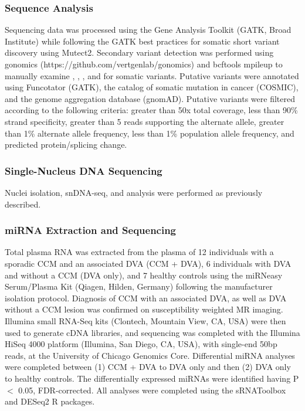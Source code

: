 \subsubsection{Sequence Analysis}
	Sequencing data was processed using the Gene Analysis Toolkit (GATK, Broad Institute) while following the GATK best practices for somatic short variant discovery using Mutect2. Secondary variant detection was performed using gonomics (https://github.com/vertgenlab/gonomics) and bcftools mpileup to manually examine , , , and  for somatic variants. Putative variants were annotated using Funcotator (GATK), the catalog of somatic mutation in cancer (COSMIC), and the genome aggregation database (gnomAD). Putative variants were filtered according to the following criteria: greater than 50x total coverage, less than 90\% strand specificity, greater than 5 reads supporting the alternate allele, greater than 1\% alternate allele frequency, less than 1\% population allele frequency, and predicted protein/splicing change. 

\subsubsection{Single-Nucleus DNA Sequencing}
Nuclei isolation, snDNA-seq, and analysis were performed as previously described\citep{ren2021}. 

\subsubsection{miRNA Extraction and Sequencing}
Total plasma RNA was extracted from the plasma of 12 individuals with a sporadic CCM and an associated DVA (CCM + DVA), 6 individuals with DVA and without a CCM (DVA only), and 7 healthy controls using the miRNeasy Serum/Plasma Kit (Qiagen, Hilden, Germany) following the manufacturer isolation protocol. Diagnosis of CCM with an associated DVA, as well as DVA without a CCM lesion was confirmed on susceptibility weighted MR imaging. Illumina small RNA-Seq kits (Clontech, Mountain View, CA, USA) were then used to generate cDNA libraries, and sequencing was completed with the Illumina HiSeq 4000 platform (Illumina, San Diego, CA, USA), with single-end 50bp reads, at the University of Chicago Genomics Core. Differential miRNA analyses were completed between (1) CCM + DVA to DVA only and then (2) DVA only to healthy controls. The differentially expressed miRNAs were identified having P $<$ 0.05, FDR-corrected. All analyses were completed using the sRNAToolbox and DESeq2 R packages\citep{love2014, rueda2015}.

